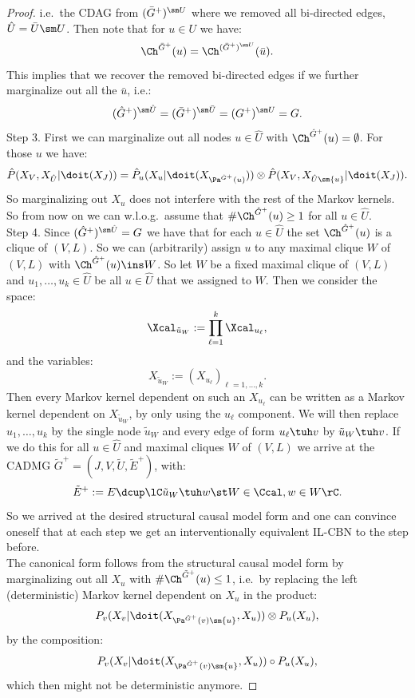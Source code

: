 \begin{proof}
    i.e.\ the CDAG from $(\bar G^+)^{\sm U}$ 
    where we removed all bi-directed edges, $\hat U = \bar U \sm U$.
    Then note that for $u \in U$ we have:
    \[\Ch^{\bar G^+}(u) = \Ch^{(\bar G^+)^{\sm U}}(\bar u).\]
    This implies that we recover the removed bi-directed edges if we further marginalize out all the $\bar u$, i.e.:
    \[(\hat G^+)^{\sm \hat U} = (\bar G^+)^{\sm \bar U} = (G^+)^{\sm U} = G. \]
    Step 3. First we can marginalize out all nodes $u \in \hat U$ with $\Ch^{\hat G^+}(u) = \emptyset$. For those $u$ we have:
    \[\hat P(X_V,X_{\hat U}|\doit(X_J)) = \hat P_u( X_u|\doit(X_{\Pa^{\hat G^+}(u)}) ) \otimes 
    \hat P(X_V,X_{\hat U\sm \{u\}}|\doit(X_J)).\]
    So marginalizing out $X_u$ does not interfere with the rest of the Markov kernels. So from now on we can w.l.o.g.\ assume that $\#\Ch^{\hat G^+}(u) \ge 1$ for all $u \in \hat U$.\\
    Step 4. 
    Since $(\hat G^+)^{\sm \hat U} = G$ we have that for each $u \in \hat U$ the set $\Ch^{\hat G^+}(u)$ is a clique of $(V,L)$.
    So we can (arbitrarily) assign $u$ to any maximal clique $W$ of $(V,L)$
    with $\Ch^{\hat G^+}(u) \ins W$. So let $W$ be a fixed maximal clique of $(V,L)$ and $u_1,\dots,u_k \in \hat U$ be all $u \in \hat U$ that we assigned to $W$. 
    Then we consider the space:
    \[ \Xcal_{\tilde u_W} := \prod_{\ell=1}^k \Xcal_{u_\ell}, \]
    and the variables:
    \[ X_{\tilde u_W} :=  (X_{u_\ell})_{\ell=1,\dots,k}. \]
    Then every Markov kernel dependent on such an $X_{u_\ell}$ can be written as a Markov kernel dependent on $X_{\tilde u_W}$, by only using the $u_\ell$ component.
    We will then replace $u_1,\dots,u_k$ by the single node $\tilde u_W$ and every edge of form $u_\ell \tuh v$ by $\tilde u_W \tuh v$.
    If we do this for all $u \in \hat U$ and maximal cliques $W$ of $(V,L)$ we arrive at the CADMG $\tilde G^+=(J,V,\tilde U, \tilde E^+)$, with:
    \[\tilde E^+ := E \dcup \lC \tilde u_W \tuh w \st W \in \Ccal, w \in W \rC.\]
    So we arrived at the desired structural causal model form and one can convince oneself that at each step we get an interventionally equivalent 
    IL-CBN to the step before. \\
 
    The canonical form follows from the structural causal model form 
    by marginalizing out all $X_u$ with $\#\Ch^{\tilde G^+}(u) \le 1$, i.e.\ by replacing the left (deterministic) 
    Markov kernel dependent on 
    $X_u$ in the product:
    \[P_v(X_v|\doit(X_{\Pa^{\tilde G^+}(v) \sm \{u\}}, X_u)) \otimes P_u(X_u),\]
    by the composition:
    \[P_v(X_v|\doit(X_{\Pa^{\tilde G^+}(v) \sm \{u\}}, X_u)) \circ P_u(X_u),\]
    which then might not be deterministic anymore.
\end{proof}



